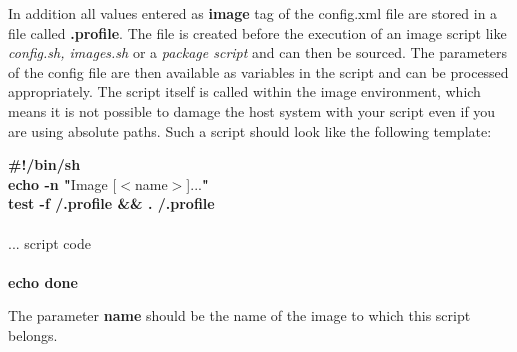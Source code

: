 \begin{itemize}
\end{itemize}

In addition all values entered as \textbf{image} tag of the config.xml
file are stored in a file called \textbf{.profile}. The file is created
before the execution of an image script like \textit{config.sh, images.sh}
or a \textit{package script} and can then be sourced. The parameters
of the config file are then available as variables in the
script and can be processed appropriately. The script itself is called
within the image environment, which means it
is not possible to damage the host system with your script even if you
are using absolute paths. Such a script should look like the following
template:

\begin{Command}{9cm}
\textbf{\#!/bin/sh}\\
\textbf{echo -n "}Image [$<$name$>$]...\textbf{"}\\
\textbf{test -f /.profile \&\& . /.profile}\\
\\
... script code\\
\\
\textbf{echo done}
\end{Command}

The parameter \textbf{name} should be the name of the image to which this
script belongs.

